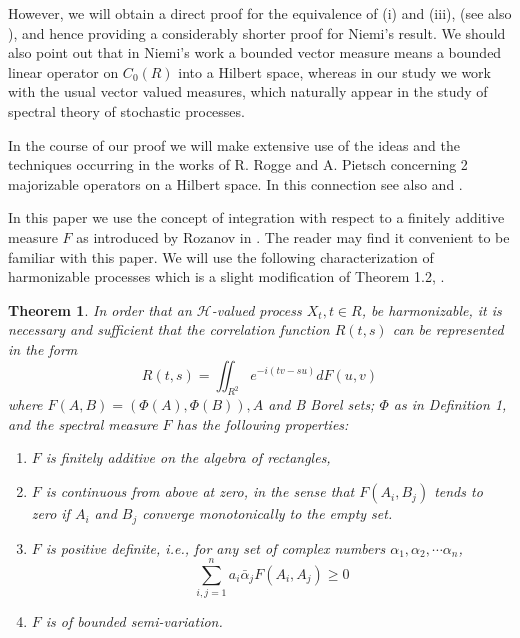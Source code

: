 \documentclass{article}
\newtheorem{theorem}{Theorem}
\begin{document}
However, we will obtain a direct proof for the equivalence of (i) and (iii), (see also \cite{kluvanek}), and hence providing a considerably shorter proof for Niemi's result. We should also point out that in Niemi's work a bounded vector measure means a bounded linear operator on $C_{0}(R)$ into a Hilbert space, whereas in our study we work with the usual vector valued measures, which naturally appear in the study of spectral theory of stochastic processes.

In the course of our proof we will make extensive use of the ideas and the techniques occurring in the works of R. Rogge \cite{rogge} and A. Pietsch \cite{pietsch} concerning 2 majorizable operators on a Hilbert space. In this connection see also \cite{dubinsky} and \cite{grothendieck}.

In this paper we use the concept of integration with respect to a finitely additive measure $F$ as introduced by Rozanov in \cite{rozanov}. The reader may find it convenient to be familiar with this paper. We will use the following characterization of harmonizable processes which is a slight modification of Theorem 1.2, \cite{rozanov}.

\begin{theorem}
In order that an $\mathscr{H}$-valued process $X_{t}, t \in R$, be harmonizable, it is necessary and sufficient that the correlation function $R(t, s)$ can be represented in the form
\begin{equation}
R(t, s)=\iint_{R^{2}} e^{-i(t v-s u)} d F(u, v)
\end{equation}
where $F(A, B)=(\Phi(A), \Phi(B)), A$ and B Borel sets; $\Phi$ as in Definition 1, and the spectral measure $F$ has the following properties:
\begin{enumerate}
\item[(a)] $F$ is finitely additive on the algebra of rectangles,
\item[(b)] $F$ is continuous from above at zero, in the sense that $F(A_{i}, B_{j})$ tends to zero if $A_{i}$ and $B_{j}$ converge monotonically to the empty set.
\item[(c)] $F$ is positive definite, i.e., for any set of complex numbers $\alpha_{1}, \alpha_{2}, \cdots \alpha_{n}$,
\begin{equation}
\sum_{i, j=1}^{n} a_{i} \bar{\alpha}_{j} F(A_{i}, A_{j}) \geq 0
\end{equation}
\item[(d)] $F$ is of bounded semi-variation.
\end{enumerate}
\end{theorem}
\end{document}

